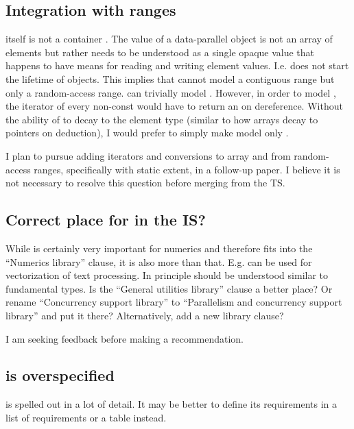 \subsection{Integration with ranges}\label{sec:ranges}
 itself is not a container \cite{P0851R0}.
The value of a data-parallel object is not an array of elements but rather needs to be understood as a single opaque value that happens to have means for reading and writing element values.
I.e.  does not start the lifetime of  objects.
This implies that  cannot model a contiguous range but only a random-access range.
 can trivially model .
However, in order to model , the iterator of every non-const  would have to return an  on dereference.
Without the ability of  to decay to the element type (similar to how arrays decay to pointers on deduction), I would prefer to simply make  model only .

I plan to pursue adding iterators and conversions to array and from random-access ranges, specifically  with static extent, in a follow-up paper.
I believe it is not necessary to resolve this question before merging  from the TS.

\subsection{Correct place for  in the IS?}

While  is certainly very important for numerics and therefore fits into the “Numerics library” clause, it is also more than that.
E.g.  can be used for vectorization of text processing.
In principle  should be understood similar to fundamental types.
Is the “General utilities library” clause a better place?
Or rename “Concurrency support library” to “Parallelism and concurrency support library” and put it there?
Alternatively, add a new library clause?

I am seeking feedback before making a recommendation.

\subsection{ is overspecified}
 is spelled out in a lot of detail.
It may be better to define its requirements in a list of requirements or a table instead.


